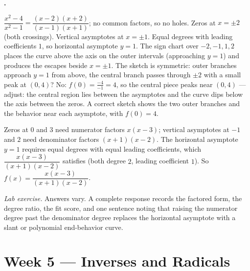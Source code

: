 \documentclass[12pt]{book}
\newcounter{soln}[section]
\newenvironment{solutions}{%
  \setcounter{soln}{0}%
  \begin{list}{\textbf{\arabic{soln}.}}{%
    \usecounter{soln}\setlength{\leftmargin}{2.2em}\setlength{\itemsep}{10pt}}%
}{\end{list}}
\begin{document}
\begin{solutions}
\item $\dfrac{x^2-4}{x^2-1}=\dfrac{(x-2)(x+2)}{(x-1)(x+1)}$; no common factors, so no
holes. Zeros at $x=\pm2$ (both crossings). Vertical asymptotes at $x=\pm1$. Equal
degrees with leading coefficients $1$, so horizontal asymptote $y=1$. The sign chart
over $-2,-1,1,2$ places the curve above the axis on the outer intervals (approaching
$y=1$) and produces the escapes beside $x=\pm1$. The sketch is symmetric: outer
branches approach $y=1$ from above, the central branch passes through $\pm2$ with a
small peak at $(0,4)$? No: $f(0)=\tfrac{-4}{-1}=4$, so the central piece peaks near
$(0,4)$ — adjust: the central region lies between the asymptotes and the curve dips
below the axis between the zeros. A correct sketch shows the two outer branches and the
behavior near each asymptote, with $f(0)=4$.

\item Zeros at $0$ and $3$ need numerator factors $x(x-3)$; vertical asymptotes at
$-1$ and $2$ need denominator factors $(x+1)(x-2)$. The horizontal asymptote $y=1$
requires equal degrees with equal leading coefficients, which $\dfrac{x(x-3)}{(x+1)(x-2)}$
satisfies (both degree $2$, leading coefficient $1$). So
$f(x)=\dfrac{x(x-3)}{(x+1)(x-2)}$.

\item \emph{Lab exercise.} Answers vary. A complete response records the factored form,
the degree ratio, the fit score, and one sentence noting that raising the numerator
degree past the denominator degree replaces the horizontal asymptote with a slant or
polynomial end-behavior curve.
\end{solutions}

\section*{Week 5 — Inverses and Radicals}
\setcounter{section}{5}
\end{document}
